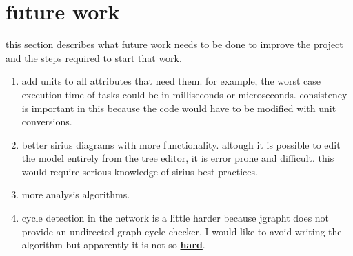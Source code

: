 \pagebreak
\section{future work}\label{future}
this section describes what future work needs to be done to improve the project
and the steps required to start that work.
\begin{enumerate}
    \item add units to all attributes that need them. for example,
    the worst case execution time of tasks could be in milliseconds
    or microseconds. consistency is important in this because
    the code would have to be modified with unit conversions.
    \item better sirius diagrams with more functionality. altough it
    is possible to edit the model entirely from the tree editor, it is
    error prone and difficult. this would require serious knowledge of
    sirius best practices.
    \item more analysis algorithms.
    \item cycle detection in the network is a little harder because jgrapht does
    not provide an undirected graph cycle checker. I would like to avoid writing
    the algorithm but apparently it is not so 
    \href{http://stackoverflow.com/questions/526331/cycles-in-an-undirected-graph}{\textbf{hard}}. 
\end{enumerate}
